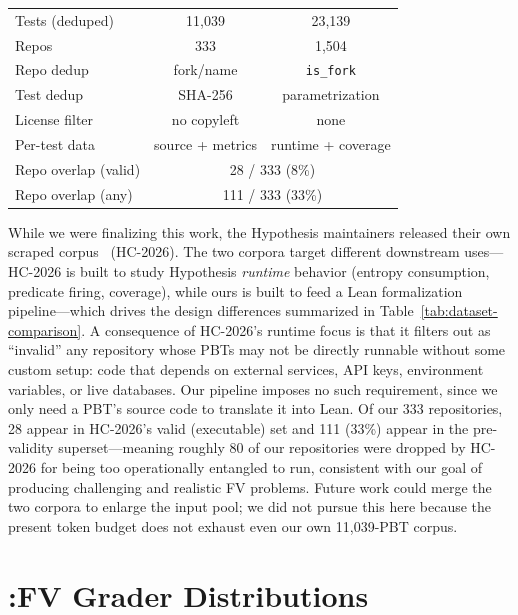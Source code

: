 \begin{table}[t]
\begin{minipage}[t]{0.62\textwidth}
\begin{tabular}{@{}l c c@{}}
    Tests (deduped)  & 11{,}039           & 23{,}139 \\
    Repos            & 333                & 1{,}504 \\
    Repo dedup       & fork/name          & \texttt{is\_fork} \\
    Test dedup       & SHA-256            & parametrization \\
    License filter   & no copyleft        & none \\
    Per-test data    & source + metrics   & runtime + coverage \\
    \midrule
    Repo overlap (valid)  & \multicolumn{2}{c}{28 / 333 \enskip(8\%)} \\
    Repo overlap (any)    & \multicolumn{2}{c}{111 / 333 \enskip(33\%)} \\
    \bottomrule
  \end{tabular}
\end{minipage}
\end{table}

While we were finalizing this work, the Hypothesis maintainers released their own scraped corpus~\cite{devoe2026hypothesis} (HC-2026).
The two corpora target different downstream uses---HC-2026 is built to study Hypothesis \emph{runtime} behavior (entropy consumption, predicate firing, coverage), while ours is built to feed a Lean formalization pipeline---which drives the design differences summarized in Table~\ref{tab:dataset-comparison}.
A consequence of HC-2026's runtime focus is that it filters out as ``invalid'' any repository whose PBTs may not be directly runnable without some custom setup: code that depends on external services, API keys, environment variables, or live databases. Our pipeline imposes no such requirement, since we only need a PBT's source code to translate it into Lean. Of our 333 repositories, 28 appear in HC-2026's valid (executable) set and 111 (33\%) appear in the pre-validity superset---meaning roughly 80 of our repositories were dropped by HC-2026 for being too operationally entangled to run, consistent with our goal of producing challenging and realistic FV problems.
Future work could merge the two corpora to enlarge the input pool; we did not pursue this here because the present token budget does not exhaust even our own 11{,}039-PBT corpus.

\section{\FVSpec:FV Grader Distributions}
\label{appndx:grader}

